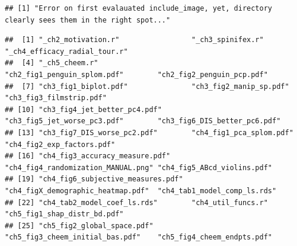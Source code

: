 \documentclass{template/monashthesis}
\begin{document}
\begin{verbatim}
## [1] "Error on first evalauated include_image, yet, directory clearly sees them in the right spot..."
\end{verbatim}

\begin{Shaded}
\begin{Highlighting}[]
\NormalTok{(}\NormalTok{)}
\end{Highlighting}
\end{Shaded}

\begin{verbatim}
##  [1] "_ch2_motivation.r"                 "_ch3_spinifex.r"                   "_ch4_efficacy_radial_tour.r"      
##  [4] "_ch5_cheem.r"                      "ch2_fig1_penguin_splom.pdf"        "ch2_fig2_penguin_pcp.pdf"         
##  [7] "ch3_fig1_biplot.pdf"               "ch3_fig2_manip_sp.pdf"             "ch3_fig3_filmstrip.pdf"           
## [10] "ch3_fig4_jet_better_pc4.pdf"       "ch3_fig5_jet_worse_pc3.pdf"        "ch3_fig6_DIS_better_pc6.pdf"      
## [13] "ch3_fig7_DIS_worse_pc2.pdf"        "ch4_fig1_pca_splom.pdf"            "ch4_fig2_exp_factors.pdf"         
## [16] "ch4_fig3_accuracy_measure.pdf"     "ch4_fig4_randomization_MANUAL.png" "ch4_fig5_ABcd_violins.pdf"        
## [19] "ch4_fig6_subjective_measures.pdf"  "ch4_figX_demographic_heatmap.pdf"  "ch4_tab1_model_comp_ls.rds"       
## [22] "ch4_tab2_model_coef_ls.rds"        "ch4_util_funcs.r"                  "ch5_fig1_shap_distr_bd.pdf"       
## [25] "ch5_fig2_global_space.pdf"         "ch5_fig3_cheem_initial_bas.pdf"    "ch5_fig4_cheem_endpts.pdf"
\end{verbatim}

\begin{Shaded}
\begin{Highlighting}[]
\NormalTok{(}\NormalTok{(}\NormalTok{),}
\end{Highlighting}
\end{Shaded}
\end{document}
